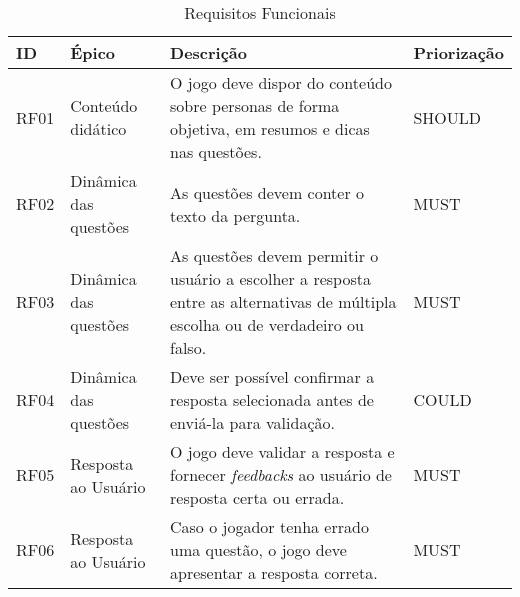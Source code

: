 

\begin{table}[htbp]
    \centering
\caption{\textcolor{textmodified}{Requisitos Funcionais}}
\label{tab:Table_rf}
\begin{tabular}{|p{0.9cm}|p{2.5cm}|p{9.3cm}|p{1.9cm}|}
\hline
\textcolor{textmodified}{ID}   & \textcolor{textmodified}{Épico}          & \textcolor{textmodified}{Descrição} & \textcolor{textadded}{Priorização}                                                                                                                                                                                                               \\ \hline
\textcolor{textmodified}{RF01} & \textcolor{textmodified}{Conteúdo didático} &\textcolor{textmodified}{O jogo deve dispor do conteúdo sobre personas de forma objetiva, em resumos e dicas nas questões.} & \textcolor{textadded}{SHOULD} \\ \hline

\textcolor{textmodified}{RF02} & \textcolor{textmodified}{Dinâmica das questões}        & \textcolor{textmodified}{As questões devem conter o texto da pergunta.} & \textcolor{textadded}{MUST}  \\ \hline

\textcolor{textmodified}{RF03} & \textcolor{textmodified}{Dinâmica das questões}        & \textcolor{textmodified}{As questões devem permitir o usuário a escolher a resposta entre as alternativas de múltipla escolha ou de verdadeiro ou falso.} & \textcolor{textadded}{MUST}  \\ \hline

\textcolor{textmodified}{RF04} & \textcolor{textmodified}{Dinâmica das questões}        & \textcolor{textmodified}{Deve ser possível confirmar a resposta selecionada antes de enviá-la para validação.} & \textcolor{textadded}{COULD}  \\ \hline

\textcolor{textmodified}{RF05} & \textcolor{textmodified}{Resposta ao Usuário}       & \textcolor{textmodified}{O jogo deve validar a resposta e fornecer \textit{feedbacks} ao usuário de resposta certa ou errada.} & \textcolor{textadded}{MUST}  \\ \hline   

\textcolor{textmodified}{RF06} & \textcolor{textmodified}{Resposta ao Usuário}       & \textcolor{textmodified}{Caso o jogador tenha errado uma questão, o jogo deve apresentar a resposta correta.} & \textcolor{textadded}{MUST}  \\ \hline


\end{tabular}
\end{table}
